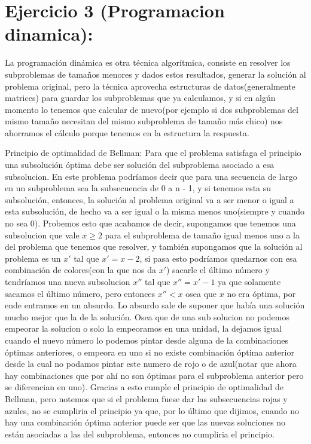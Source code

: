 \section{Ejercicio 3 (Programacion dinamica):}
La programación dinámica es otra técnica algorítmica, consiste en resolver los subproblemas de tamaños menores y dados estos resultados, generar la solución al problema original, pero la técnica aprovecha estructuras de datos(generalmente matrices) para guardar los subproblemas que ya calculamos, y si en algún momento lo tenemos que calcular de nuevo(por ejemplo si dos subproblemas del mismo tamaño necesitan del mismo subproblema de tamaño más chico) nos ahorramos el cálculo porque tenemos en la estructura la respuesta.

Principio de optimalidad de Bellman:
Para que el problema satisfaga el principio una subsolución óptima debe ser solución del subproblema asociado a esa subsolucion. En este problema podríamos decir que para una secuencia de largo en un subproblema sea la subsecuencia de 0 a n - 1, y si tenemos esta su subsolución, entonces, la solución al problema original va a ser menor o igual a esta subsolución, de hecho va a ser igual o la misma menos uno(siempre y cuando no sea 0). Probemos esto que acabamos de decir, supongamos que tenemos una subsolucion que vale $x \geq 2$ para el subproblema de tamaño igual menos uno a la del problema que tenemos que resolver, y también supongamos que la solución al problema es un $x'$ tal que $x' = x - 2$, si pasa esto podríamos quedarnos con esa combinación de colores(con la que nos da $x'$) sacarle el último número y tendríamos una nueva subsolucion $x''$ tal que $x'' = x'-1$ ya que solamente sacamos el último número, pero entonces $x'' < x$ osea que $x$ no era óptima, por ende entramos en un absurdo. Lo absurdo sale de suponer que había una solución mucho mejor que la de la solución. Osea que de una sub solucion no podemos empeorar la solucion o solo la empeoramos en una unidad, la dejamos igual cuando el nuevo número lo podemos pintar desde alguna de la combinaciones óptimas anteriores, o empeora en uno si no existe combinación óptima anterior desde la cual no podamos pintar este numero de rojo o de azul(notar que ahora hay combinaciones que por ahí no son óptimas para el subproblema anterior pero se diferencian en uno). Gracias a esto cumple el principio de optimalidad de Bellman, pero notemos que si el problema fuese dar las subsecuencias rojas y azules, no se cumpliria el principio ya que, por lo último que dijimos, cuando no hay una combinación óptima anterior puede ser que las nuevas soluciones no están asociadas a las del subproblema, entonces no cumpliria el principio.

